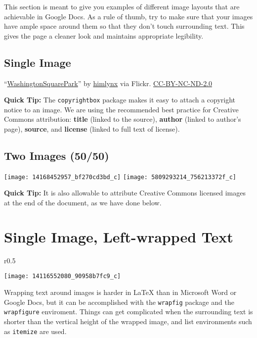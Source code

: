 \documentclass[notitlepage]{nyu22report}
\begin{document}
This section is meant to give you examples of different image layouts that are
achievable in Google Docs. As a rule of thumb, try to make sure that your images
have ample space around them so that they don’t touch surrounding text. This
gives the page a cleaner look and maintains appropriate legibility.

\subsection*{Single Image}

  {“\href{https://flic.kr/p/eeBz4t}{WashingtonSquarePark}” 
    by \href{https://www.flickr.com/photos/elizaroff/}{himlynx} 
    via Flickr. \href{https://creativecommons.org/licenses/by-nc-nd/2.0/}{CC-BY-NC-ND-2.0}}

\textbf{\primarycolor Quick Tip:} The \texttt{copyrightbox} package makes it
easy to attach a copyright notice to an image. We are using the recommended best
practice for Creative Commons attribution: \textbf{title} (linked to the
source), \textbf{author} (linked to author's page), \textbf{source}, and
\textbf{license} (linked to full text of license).

\subsection*{Two Images (50/50)}

\texttt{[image: 14168452957\_bf270cd3bd\_c]}
\hfill
\texttt{[image: 5809293214\_756213372f\_c]}

\textbf{\primarycolor Quick Tip:}
It is also allowable to attribute Creative Commons licensed images at the end of
the document, as we have done below.


\section*{Single Image, Left-wrapped Text}

\begin{wrapfigure}{r}{0.5\textwidth}
    \begin{center}
      \texttt{[image: 14116552080\_90958b7fc9\_c]}
    \end{center}
  \end{wrapfigure}
Wrapping text around images is harder in \LaTeX{} than in Microsoft Word or
Google Docs, but it can be accomplished with the \texttt{wrapfig} package and the
\texttt{wrapfigure} enviroment. Things can get complicated when the surrounding
text is shorter than the vertical height of the wrapped image, and list
environments such as \texttt{itemize} are used.
\end{document}
